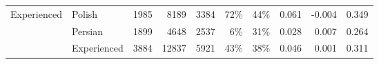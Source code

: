 \begin{table}
\begin{tabular}{llrrr|rrrrr}
\cline{1-10}
\multirow{3}{*}{Experienced} & Polish &                  1985 &                       8189 &                  3384 &                    72\% &                                                44\% &                 0.061 &                          -0.004 &       0.349 \\
            & Persian &                  1899 &                       4648 &                  2537 &                     6\% &                                                31\% &                 0.028 &                           0.007 &       0.264 \\
            & Experienced &                  3884 &                      12837 &                  5921 &                    43\% &                                                38\% &                 0.046 &                           0.001 &       0.311 \\
\bottomrule
\end{tabular}
\end{table}

